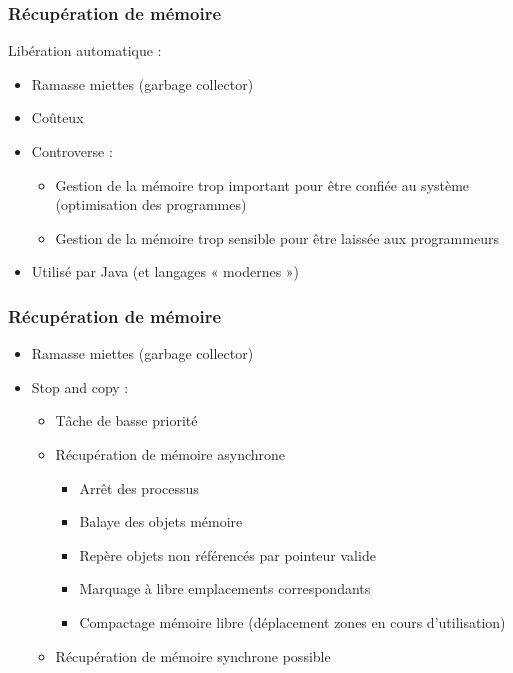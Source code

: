 \begin{frame}
\frametitle{Récupération de mémoire}
Libération automatique :
\begin{itemize}
\item Ramasse miettes (garbage collector)
\item Coûteux
\item Controverse :
\begin{itemize}
\item Gestion de la mémoire trop important pour être confiée au système (optimisation des programmes)
\item Gestion de la mémoire trop sensible pour être laissée aux programmeurs
\end{itemize}
\item Utilisé par Java (et langages « modernes »)
\end{itemize}
\end{frame}


\begin{frame}
\frametitle{Récupération de mémoire}
\begin{itemize}
\item Ramasse miettes (garbage collector)
\item Stop and copy :
\begin{itemize}
\item Tâche de basse priorité
\item Récupération de mémoire asynchrone
\begin{itemize}
\item Arrêt des processus
\item Balaye des objets mémoire
\item Repère objets non référencés par pointeur valide
\item Marquage à libre emplacements correspondants
\item Compactage mémoire libre (déplacement zones en cours d’utilisation)
\end{itemize}
\item Récupération de mémoire synchrone possible
\end{itemize}
\end{itemize}
\end{frame}

